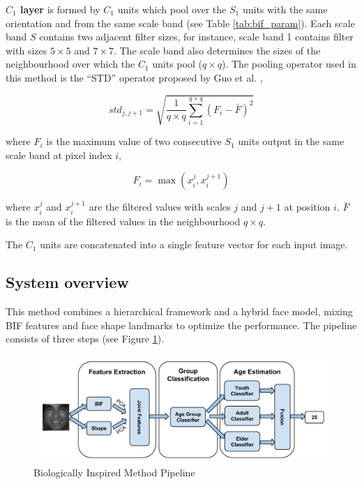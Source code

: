 \textbf{$C_1$ layer} is formed by $C_1$ units which pool over the $S_1$ units with the same orientation and from the same scale band (see Table \ref{tab:bif_param}). Each scale band $S$ contains two adjacent filter sizes, for instance, scale band 1 contains filter with sizes $5\times5$ and $7\times7$. The scale band also determines the sizes of the neighbourhood over which the $C_1$ units pool ($q\times q$). The pooling operator used in this method is the ``STD'' operator proposed by Guo et al. \cite{conf/cvpr/GuoMFH09},

\begin{equation}
std_{j,j+1} = \sqrt{\frac{1}{q\times q}\sum_{i=1}^{q\times q}(F_i - \bar{F})^2} 
\end{equation}

where $F_i$ is the maximum value of two consecutive $S_1$ units output in the same scale band at pixel index $i$, 

\begin{equation}
F_i = \max(x_i^j,x_i^{j+1})
\end{equation}

where $x_i^j$ and $x_i^{j+1}$ are the filtered values with scales $j$ and $j+1$ at position $i$. $\bar{F}$ is the mean of the filtered values in the neighbourhood $q\times q$.

The $C_1$ units are concatenated into a single feature vector for each input image.


\subsection{System overview}

This method combines a hierarchical framework and a hybrid face model, mixing BIF features and face shape landmarks to optimize the performance. The pipeline consists of three steps (see Figure \ref{fig:pipeline}).

\begin{figure}[!h]
	\centering
	\includegraphics[width=\textwidth]{figures/pipeline}
	\caption{Biologically Inspired Method Pipeline}
	\label{fig:pipeline}
\end{figure}

